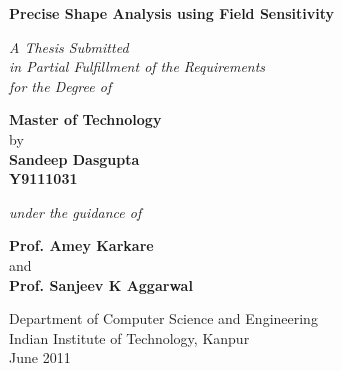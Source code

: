 \documentclass[12pt,twoside,openright]{report}
\begin{document}
\begin{titlepage}
\thispagestyle{empty}
\vspace*{0.5cm}
{\centering     
\large
{\Large\bf Precise Shape Analysis using Field Sensitivity }\\
\vspace{1cm}

\emph{A Thesis Submitted \\ in Partial Fulfillment of the Requirements \\ for the Degree of}

 \textbf{Master of Technology}\\
\vspace{.5cm}
by \\
\vspace{.2cm}
\rm
{\large \bf {Sandeep Dasgupta}}\\
{\large \bf {Y9111031}}

\vspace{.5cm}

{\it{under the guidance of}} \\
\vspace{.3cm}

\hspace{.05cm} {\large \bf {Prof. Amey Karkare}}\\
\vspace {0.1cm}
and \\
\vspace {0.1cm}
\hspace{.05cm} {\large \bf {Prof. Sanjeev K Aggarwal}}\\
\vspace {0.5cm}

\begin{figure}[h] 
{\par}
\end{figure} 
\vspace{1cm}
Department of Computer Science and Engineering \\ 
Indian Institute of Technology, Kanpur\\ 
{\centering
\hspace{6.5cm}June 2011} 
}
\pagebreak 
\end{titlepage}
\end{document}
